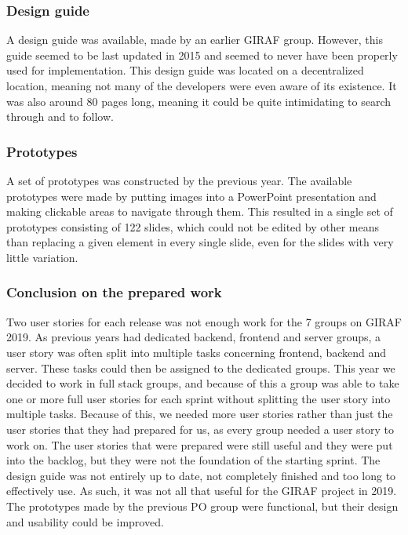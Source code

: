 \subsubsection{Design guide}
A design guide was available, made by an earlier GIRAF group.
However, this guide seemed to be last updated in 2015 and seemed to never have been properly used for implementation.
This design guide was located on a decentralized location, meaning not many of the developers were even aware of its existence.
It was also around 80 pages long, meaning it could be quite intimidating to search through and to follow.

\subsubsection{Prototypes}
A set of prototypes was constructed by the previous year.
The available prototypes were made by putting images into a PowerPoint presentation and making clickable areas to navigate through them.
This resulted in a single set of prototypes consisting of 122 slides, which could not be edited by other means than replacing a given element in every single slide, even for the slides with very little variation.


\subsubsection{Conclusion on the prepared work}
Two user stories for each release was not enough work for the 7 groups on GIRAF 2019. 
As previous years had dedicated backend, frontend and server groups, a user story was often split into multiple tasks concerning frontend, backend and server.
These tasks could then be assigned to the dedicated groups.
This year we decided to work in full stack groups, and because of this a group was able to take one or more full user stories for each sprint without splitting the user story into multiple tasks.
Because of this, we needed more user stories rather than just the user stories that they had prepared for us, as every group needed a user story to work on.
The user stories that were prepared were still useful and they were put into the backlog, but they were not the foundation of the starting sprint.
The design guide was not entirely up to date, not completely finished and too long to effectively use.
As such, it was not all that useful for the GIRAF project in 2019.
The prototypes made by the previous PO group were functional, but their design and usability could be improved. 


